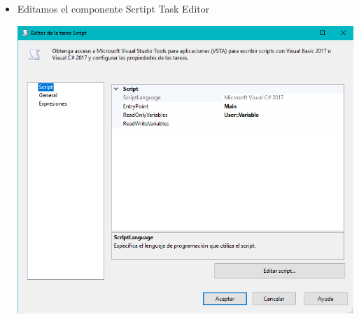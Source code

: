\begin{itemize}
\item Editamos el componente Scrtipt Task Editor
\begin{center}
	\includegraphics[width=14cm]{./Imagenes/tarea2_9}
	\end{center}


\end{itemize}

